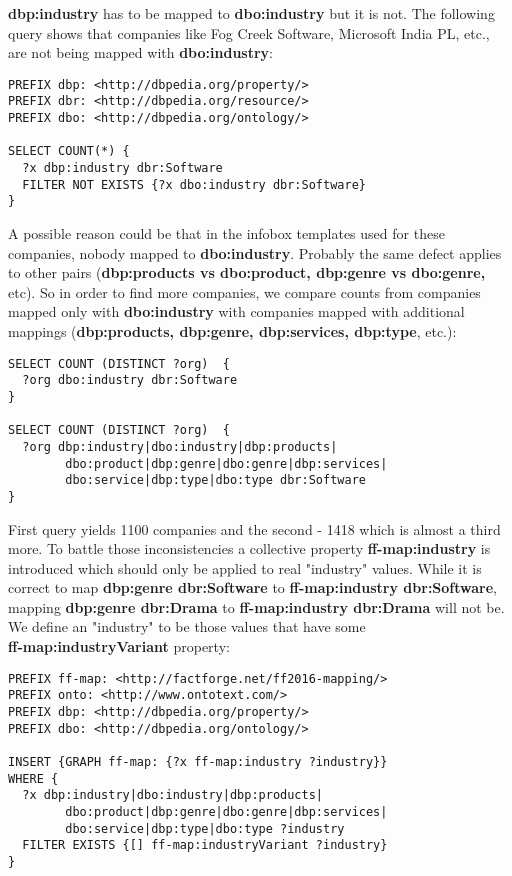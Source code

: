 \begin{enumerate}
    \textbf{dbp:industry} has to be mapped to \textbf{dbo:industry} but it is not. The following query shows that companies like Fog Creek Software, Microsoft India PL, etc., are not being mapped with \textbf{dbo:industry}:

\begin{verbatim}
PREFIX dbp: <http://dbpedia.org/property/>
PREFIX dbr: <http://dbpedia.org/resource/>
PREFIX dbo: <http://dbpedia.org/ontology/>

SELECT COUNT(*) {
  ?x dbp:industry dbr:Software
  FILTER NOT EXISTS {?x dbo:industry dbr:Software}
}
\end{verbatim}
    A possible reason could be that in the infobox templates used for these companies, nobody mapped to \textbf{dbo:industry}. Probably the same defect applies to other pairs (\textbf{dbp:products vs dbo:product, dbp:genre vs dbo:genre,} etc). So in order to find more companies, we compare counts from companies mapped only with \textbf{dbo:industry} with companies mapped with additional mappings (\textbf{dbp:products, dbp:genre, dbp:services, dbp:type}, etc.):

\begin{verbatim}
SELECT COUNT (DISTINCT ?org)  {
  ?org dbo:industry dbr:Software
}

SELECT COUNT (DISTINCT ?org)  {
  ?org dbp:industry|dbo:industry|dbp:products|
        dbo:product|dbp:genre|dbo:genre|dbp:services|
        dbo:service|dbp:type|dbo:type dbr:Software
}
\end{verbatim}
    First query yields 1100 companies and the second - 1418 which is almost a third more. To battle those inconsistencies a collective property \textbf{ff-map:industry} is introduced which should only be applied to real "industry" values. While it is correct to map \textbf{dbp:genre dbr:Software} to \textbf{ff-map:industry dbr:Software}, mapping \textbf{dbp:genre dbr:Drama} to \textbf{ff-map:industry dbr:Drama} will not be. We define an "industry" to be those values that have some \\ \textbf{ff-map:industryVariant} property:

\begin{verbatim}
PREFIX ff-map: <http://factforge.net/ff2016-mapping/>
PREFIX onto: <http://www.ontotext.com/>
PREFIX dbp: <http://dbpedia.org/property/>
PREFIX dbo: <http://dbpedia.org/ontology/>

INSERT {GRAPH ff-map: {?x ff-map:industry ?industry}}
WHERE {
  ?x dbp:industry|dbo:industry|dbp:products|
        dbo:product|dbp:genre|dbo:genre|dbp:services|
        dbo:service|dbp:type|dbo:type ?industry
  FILTER EXISTS {[] ff-map:industryVariant ?industry}
}
\end{verbatim}


\end{enumerate}
